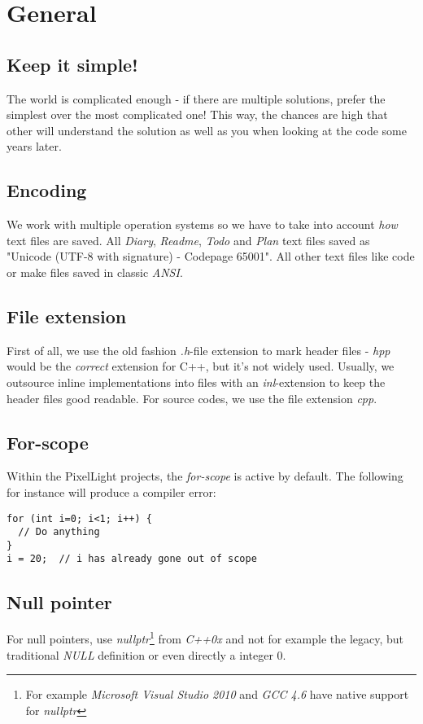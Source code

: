 \chapter{General}




\section{Keep it simple!}
The world is complicated enough - if there are multiple solutions, prefer the simplest over the most complicated one! This way, the chances are high that other will understand the solution as well as you when looking at the code some years later.




\section{Encoding}
We work with multiple operation systems so we have to take into account \emph{how} text files are saved. All \emph{Diary}, \emph{Readme}, \emph{Todo} and \emph{Plan} text files saved as "Unicode (UTF-8 with signature) - Codepage 65001". All other text files like code or make files saved in classic \emph{ANSI}.




\section{File extension}
First of all, we use the old fashion \emph{.h}-file extension to mark header files - \emph{hpp} would be the \emph{correct} extension for C++, but it's not widely used. Usually, we outsource inline implementations into files with an \emph{inl}-extension to keep the header files good readable. For source codes, we use the file extension \emph{cpp}.




\section{For-scope}
Within the PixelLight projects, the \emph{for-scope} is active by default. The following for instance will produce a compiler error:
\begin{lstlisting}[caption=for-scope]
for (int i=0; i<1; i++) {
  // Do anything
}
i = 20;  // i has already gone out of scope
\end{lstlisting}




\section{Null pointer}
For null pointers, use \emph{nullptr}\footnote{For example \emph{Microsoft Visual Studio 2010} and \emph{GCC 4.6} have native support for \emph{nullptr}} from \emph{C++0x} and not for example the legacy, but traditional \emph{NULL} definition or even directly a integer $0$.

